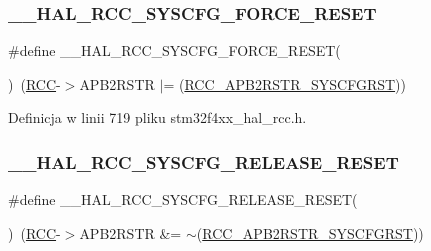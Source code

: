 \subsubsection{\texorpdfstring{\+\_\+\+\_\+\+H\+A\+L\+\_\+\+R\+C\+C\+\_\+\+S\+Y\+S\+C\+F\+G\+\_\+\+F\+O\+R\+C\+E\+\_\+\+R\+E\+S\+ET}{\_\_HAL\_RCC\_SYSCFG\_FORCE\_RESET}}
{\footnotesize\ttfamily \#define \+\_\+\+\_\+\+H\+A\+L\+\_\+\+R\+C\+C\+\_\+\+S\+Y\+S\+C\+F\+G\+\_\+\+F\+O\+R\+C\+E\+\_\+\+R\+E\+S\+ET(\begin{DoxyParamCaption}{ }\end{DoxyParamCaption})~(\hyperlink{group___peripheral__declaration_ga74944438a086975793d26ae48d5882d4}{R\+CC}-\/$>$A\+P\+B2\+R\+S\+TR $\vert$= (\hyperlink{group___peripheral___registers___bits___definition_ga813d42b8d48ae6379c053a44870af49d}{R\+C\+C\+\_\+\+A\+P\+B2\+R\+S\+T\+R\+\_\+\+S\+Y\+S\+C\+F\+G\+R\+ST}))}



Definicja w linii 719 pliku stm32f4xx\+\_\+hal\+\_\+rcc.\+h.

\mbox{\label{group___r_c_c___a_p_b2___force___release___reset_ga56de80d50f5ab276ebdeee16a0e2a31b}} 
\subsubsection{\texorpdfstring{\+\_\+\+\_\+\+H\+A\+L\+\_\+\+R\+C\+C\+\_\+\+S\+Y\+S\+C\+F\+G\+\_\+\+R\+E\+L\+E\+A\+S\+E\+\_\+\+R\+E\+S\+ET}{\_\_HAL\_RCC\_SYSCFG\_RELEASE\_RESET}}
{\footnotesize\ttfamily \#define \+\_\+\+\_\+\+H\+A\+L\+\_\+\+R\+C\+C\+\_\+\+S\+Y\+S\+C\+F\+G\+\_\+\+R\+E\+L\+E\+A\+S\+E\+\_\+\+R\+E\+S\+ET(\begin{DoxyParamCaption}{ }\end{DoxyParamCaption})~(\hyperlink{group___peripheral__declaration_ga74944438a086975793d26ae48d5882d4}{R\+CC}-\/$>$A\+P\+B2\+R\+S\+TR \&= $\sim$(\hyperlink{group___peripheral___registers___bits___definition_ga813d42b8d48ae6379c053a44870af49d}{R\+C\+C\+\_\+\+A\+P\+B2\+R\+S\+T\+R\+\_\+\+S\+Y\+S\+C\+F\+G\+R\+ST}))}



